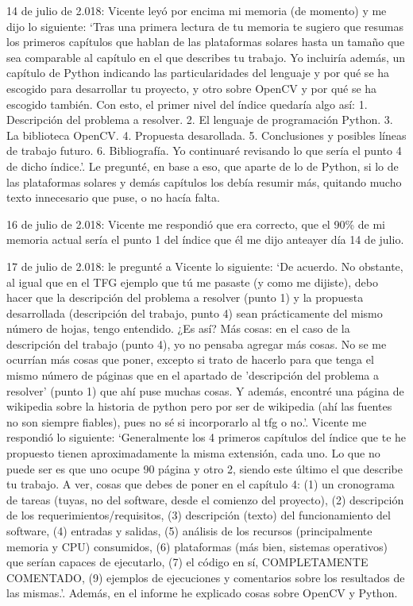 14 de julio de 2.018: Vicente leyó por encima mi memoria (de momento) y me dijo lo siguiente: ‘Tras una primera lectura de tu memoria te sugiero que resumas los primeros capítulos que hablan de las plataformas solares hasta un tamaño que sea comparable al capítulo en el que describes tu trabajo. Yo incluiría además, un capítulo de Python indicando las particularidades del lenguaje y por qué se ha escogido para desarrollar tu proyecto, y otro sobre OpenCV y por qué se ha escogido también. Con esto, el primer nivel del índice quedaría algo así:
1. Descripción del problema a resolver.
2. El lenguaje de programación Python.
3. La biblioteca OpenCV.
4. Propuesta desarollada.
5. Conclusiones y posibles líneas de trabajo futuro.
6. Bibliografía.
Yo continuaré revisando lo que sería el punto 4 de dicho índice.’. Le pregunté, en base a eso, que aparte de lo de Python, si lo de las plataformas solares y demás capítulos los debía resumir más, quitando mucho texto innecesario que puse, o no hacía falta.

16 de julio de 2.018: Vicente me respondió que era correcto, que el 90\% de mi memoria actual sería el punto 1 del índice que él me dijo anteayer día 14 de julio.

17 de julio de 2.018: le pregunté a Vicente lo siguiente: ‘De acuerdo. No obstante, al igual que en el TFG ejemplo que tú me pasaste (y como me dijiste), debo hacer que la descripción del problema a resolver (punto 1) y la propuesta desarrollada (descripción del trabajo, punto 4) sean prácticamente del mismo número de hojas, tengo entendido. ¿Es así? Más cosas: en el caso de la descripción del trabajo (punto 4), yo no pensaba agregar más cosas. No se me ocurrían más cosas que poner, excepto si trato de hacerlo para que tenga el mismo número de páginas que en el apartado de 'descripción del problema a resolver' (punto 1) que ahí puse muchas cosas. Y además, encontré una página de wikipedia sobre la historia de python pero por ser de wikipedia (ahí las fuentes no son siempre fiables), pues no sé si incorporarlo al tfg o no.’. Vicente me respondió lo siguiente: ‘Generalmente los 4 primeros capítulos del índice que te he propuesto tienen aproximadamente la misma extensión, cada uno. Lo que no puede ser es que uno ocupe 90 página y otro 2, siendo este último el que describe tu trabajo. A ver, cosas que debes de poner en el capítulo 4: (1) un cronograma de tareas (tuyas, no del software, desde el comienzo del proyecto), (2) descripción de los requerimientos/requisitos, (3) descripción (texto) del funcionamiento del software, (4) entradas y salidas, (5) análisis de los recursos (principalmente memoria y CPU) consumidos, (6) plataformas (más bien, sistemas operativos) que serían capaces de ejecutarlo, (7) el código en sí, COMPLETAMENTE COMENTADO, (9) ejemplos de ejecuciones y comentarios sobre los resultados de las mismas.’. Además, en el informe he explicado cosas sobre OpenCV y Python.

